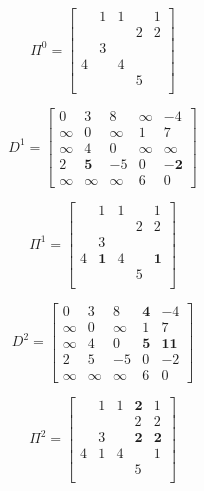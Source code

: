 				\begin{equation}
					\Pi^0 = \begin{bmatrix}
						& 1 & 1 & & 1 \\
						& & & 2 & 2\\
						& 3 & & & \\
						4 & & 4 & & \\
						& & & 5 & \\
					\end{bmatrix}
				\end{equation}

				\begin{equation}
					D^1 = \begin{bmatrix}
						0 & 3 & 8 &\infty & -4 \\
						\infty & 0  &\infty & 1 & 7 \\
						\infty & 4 & 0 &\infty &\infty\\
						2 & \mathbf{5} & -5 & 0 &\mathbf{-2}\\
						\infty & \infty & \infty & 6 & 0
					\end{bmatrix}
				\end{equation}

				\begin{equation}
					\Pi^1 = \begin{bmatrix}
						& 1 & 1 & & 1 \\
						& & & 2 & 2\\
						& 3 & & & \\
						4 & \mathbf{1} & 4 & & \mathbf{1}\\
						& & & 5 & \\
					\end{bmatrix}
				\end{equation}

				\begin{equation}
					D^2 = \begin{bmatrix}
						0 & 3 & 8 &\mathbf{4} & -4 \\
						\infty & 0  &\infty & 1 & 7 \\
						\infty & 4 & 0 &\mathbf{5} &\mathbf{11}\\
						2 & 5 & -5 & 0 &-2\\
						\infty & \infty & \infty & 6 & 0
					\end{bmatrix}
				\end{equation}

				\begin{equation}
					\Pi^2 = \begin{bmatrix}
						& 1 & 1 & \mathbf{2} & 1 \\
						& & & 2 & 2\\
						& 3 & & \mathbf{2} & \mathbf{2} \\
						4 & 1 & 4 & & 1\\
						& & & 5 & \\
					\end{bmatrix}
				\end{equation}

